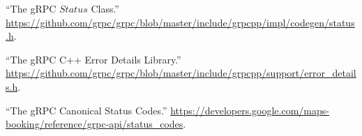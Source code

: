 \documentclass[11pt]{article}
\begin{document}
{{\begin{thebibliography}{39}
\mdbibitemlabel{{}[32]}\textquotedblleft{}The gRPC $Status$ Class.\textquotedblright{} \href{https://github.com/grpc/grpc/blob/master/include/grpcpp/impl/codegen/status.h}{{\ttfamily https://\hspace{0pt}github.\hspace{0pt}com/\hspace{0pt}grpc/\hspace{0pt}grpc/\hspace{0pt}blob/\hspace{0pt}master/\hspace{0pt}include/\hspace{0pt}grpcpp/\hspace{0pt}impl/\hspace{0pt}codegen/\hspace{0pt}status.\hspace{0pt}h}}.\label{grpcstatus}%

\mdbibitemlabel{{}[33]}\textquotedblleft{}The gRPC C++ Error Details Library.\textquotedblright{} \href{https://github.com/grpc/grpc/blob/master/include/grpcpp/support/error_details.h}{{\ttfamily https://\hspace{0pt}github.\hspace{0pt}com/\hspace{0pt}grpc/\hspace{0pt}grpc/\hspace{0pt}blob/\hspace{0pt}master/\hspace{0pt}include/\hspace{0pt}grpcpp/\hspace{0pt}support/\hspace{0pt}error\_\hspace{0pt}details.\hspace{0pt}h}}.\label{grpcerrordetails}%

\mdbibitemlabel{{}[34]}\textquotedblleft{}The gRPC Canonical Status Codes.\textquotedblright{} \href{https://developers.google.com/maps-booking/reference/grpc-api/status_codes}{{\ttfamily https://\hspace{0pt}developers.\hspace{0pt}google.\hspace{0pt}com/\hspace{0pt}maps-\hspace{0pt}booking/\hspace{0pt}reference/\hspace{0pt}grpc-\hspace{0pt}api/\hspace{0pt}status\_\hspace{0pt}codes}}.\label{grpcstatuscodes}%


\end{thebibliography}}}
\end{document}
